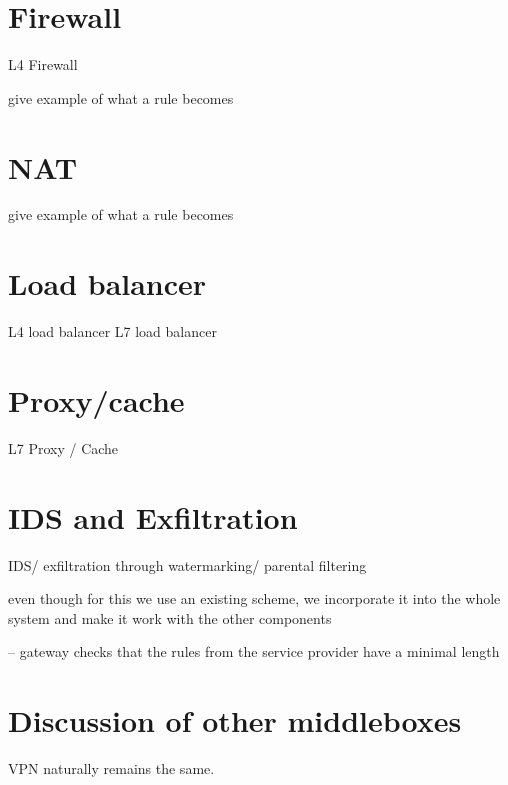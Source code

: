 
\section{Firewall}\label{sec:firewall}

L4 Firewall

give example of what a rule becomes

\section{NAT}\label{sec:nat}

give example of what a rule becomes

\section{Load balancer}\label{sec:loadb}

L4 load balancer
L7 load balancer

\section{Proxy/cache}\label{sec:proxy}

L7 Proxy / Cache

\section{IDS and Exfiltration}\label{sec:IDS}

IDS/ exfiltration through watermarking/ parental filtering

even though for this we use an existing scheme, we incorporate it into the whole
system and make it work with the other components

-- gateway checks that the rules from the service provider have a minimal length 


\section{Discussion of other middleboxes}\label{sec:vpn} \label{sec:other} \label{sec:not_supp}

VPN naturally remains the same. 